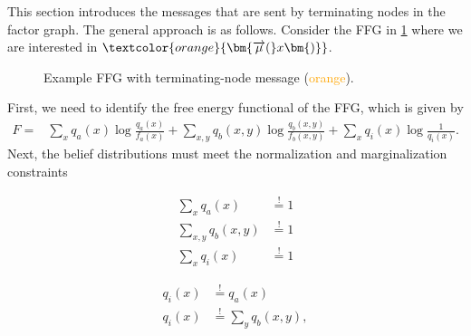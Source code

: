 This section introduces the messages that are sent by terminating nodes in the factor graph. The general approach is as follows. Consider the FFG in \cref{fig:9} where we are interested in \(\textcolor{orange}{\bm{\overrightarrow{\mu}(}x\bm{)}}\).
\begin{figure}[htbp]
    \centering


    \caption{Example FFG with terminating-node message (\textcolor{orange}{orange}).}
    \label{fig:9}
\end{figure}
First, we need to identify the free energy functional of the FFG, which is given by
\begin{equation}
    \begin{split}
        F = & \sum_x q_a(x) \log \frac{q_a(x)}{f_a(x)} + \sum_{x,y} q_b(x,y) \log \frac{q_b(x,y)}{f_b(x,y)} + \sum_x q_i(x) \log \frac{1}{q_i(x)}.
    \end{split}
\end{equation}
Next, the belief distributions must meet the normalization and marginalization constraints

\noindent
\begin{minipage}[t]{0.5\textwidth}
    \setlength{\abovedisplayskip}{0pt}
    \setlength{\belowdisplayskip}{0pt}
    \begin{align}
        \sum_x q_a(x)       & \overset{!}{=} 1 \\
        \sum_{x,y} q_b(x,y) & \overset{!}{=} 1 \\
        \sum_x q_i(x)       & \overset{!}{=} 1
    \end{align}
\end{minipage}\hfill
\begin{minipage}[t]{0.5\textwidth}
    \setlength{\abovedisplayskip}{0pt}
    \setlength{\belowdisplayskip}{0pt}
    \begin{align}
        q_i(x) & \overset{!}{=} q_a(x)           \\[0.8em]
        q_i(x) & \overset{!}{=} \sum_y q_b(x,y),
    \end{align}
\end{minipage}


